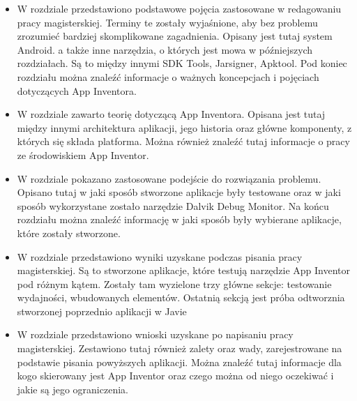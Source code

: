 \begin{itemize}
\item W rozdziale  przedstawiono podstawowe pojęcia zastosowane w redagowaniu pracy magisterskiej. Terminy te zostały wyjaśnione, aby bez problemu zrozumieć bardziej skomplikowane zagadnienia. Opisany jest tutaj system Android.
a także inne narzędzia, o których jest mowa w późniejszych rozdziałach. Są to między innymi SDK Tools, Jarsigner, Apktool.
Pod koniec rozdziału można znaleźć informacje o ważnych koncepcjach i pojęciach dotyczących App Inventora.
\item W rozdziale  zawarto teorię dotyczącą App Inventora. Opisana jest tutaj między innymi architektura aplikacji, jego historia oraz główne komponenty, z których się składa platforma. Można również znaleźć tutaj informacje o pracy ze środowiskiem App Inventor.
\item W rozdziale  pokazano zastosowane podejście do rozwiązania problemu. Opisano tutaj w jaki sposób stworzone aplikacje były testowane oraz w jaki sposób wykorzystane zostało narzędzie Dalvik Debug Monitor. Na końcu rozdziału można znaleźć informację w jaki sposób były wybierane aplikacje, które zostały stworzone.
\item W rozdziale  przedstawiono wyniki uzyskane podczas pisania pracy magisterskiej. Są to stworzone aplikacje, które testują narzędzie App Inventor pod różnym kątem. Zostały tam wyzielone trzy główne sekcje: testowanie wydajności, wbudowanych elementów. Ostatnią sekcją jest próba odtworznia stworzonej poprzednio aplikacji w Javie
\item W rozdziale  przedstawiono wnioski uzyskane po napisaniu pracy magisterskiej. Zestawiono  tutaj również zalety oraz wady, zarejestrowane na podstawie pisania powyższych aplikacji. Można znaleźć tutaj informacje dla kogo skierowany jest App Inventor oraz czego można od niego oczekiwać i jakie są jego ograniczenia.
\end{itemize}



















